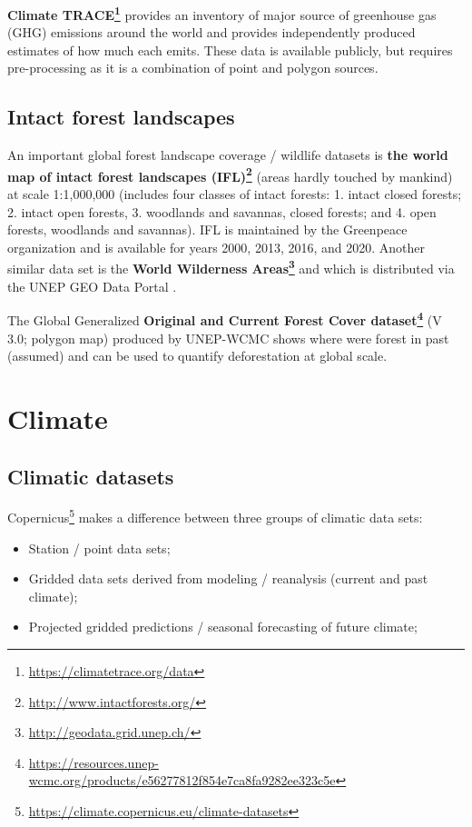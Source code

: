 \documentclass[
  graybox,natbib,nospthms]{svmono}
\providecommand{\tightlist}{%
  \setlength{\itemsep}{0pt}\setlength{\parskip}{0pt}}
\providecommand{\tightlist}{\setlength{\itemsep}{0pt}\setlength{\parskip}{0pt}}
\renewcommand{\href}[2]{#2 (\url{#1})}
\renewcommand{\href}[2]{#2\footnote{\url{#1}}}
\begin{document}
\textbf{\href{https://climatetrace.org/data}{Climate TRACE}} provides an inventory of major source of greenhouse gas (GHG) emissions
around the world and provides independently produced estimates of how much each emits.
These data is available publicly, but requires pre-processing as it is a combination of
point and polygon sources.

\hypertarget{intact-forest-landscapes}{%
\subsection{Intact forest landscapes}\label{intact-forest-landscapes}}

An important global forest landscape coverage / wildlife datasets is \textbf{\href{http://www.intactforests.org/}{the world map of intact forest landscapes (IFL)}} (areas hardly touched by mankind)
at scale 1:1,000,000 (includes four classes of intact forests: 1. intact closed forests;
2. intact open forests, 3. woodlands and savannas, closed forests; and 4. open forests, woodlands and savannas).
IFL is maintained by the Greenpeace organization \citep{potapov2008mapping} and is available for years 2000, 2013, 2016, and 2020.
Another similar data set is the \textbf{\href{http://geodata.grid.unep.ch/}{World Wilderness Areas}}
and which is distributed via the UNEP GEO Data Portal \citep{mccloskey1989reconnaissance}.

The Global Generalized \textbf{\href{https://resources.unep-wcmc.org/products/e56277812f854e7ca8fa9282ee323c5e}{Original and Current Forest Cover dataset}} (V 3.0; polygon map) produced by UNEP-WCMC
shows where were forest in past (assumed) and can be used to quantify deforestation at
global scale.

\hypertarget{climate}{%
\section{Climate}\label{climate}}

\hypertarget{climatic-datasets}{%
\subsection{Climatic datasets}\label{climatic-datasets}}

\href{https://climate.copernicus.eu/climate-datasets}{Copernicus} makes a difference between three groups of climatic data sets:

\begin{itemize}
\tightlist
\item
  Station / point data sets;
\item
  Gridded data sets derived from modeling / reanalysis (current and past climate);
\item
  Projected gridded predictions / seasonal forecasting of future climate;
\end{itemize}
\end{document}
